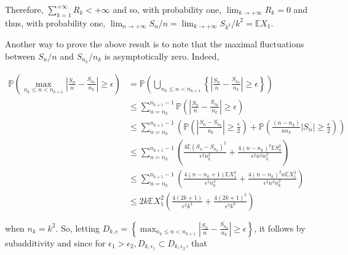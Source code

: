 \documentclass{amsbook}
\theoremstyle{plain}%
\theoremstyle{definition}
\theoremstyle{remark}
\begin{document}
    Therefore, $\sum_{k=1}^{+\infty} R_{k}<+\infty$ and so, with probability one, $\lim _{k \rightarrow+\infty} R_{k}=0$ and thus, with probability one, $\lim _{n \rightarrow+\infty} S_{n} / n=\lim _{k \rightarrow+\infty} S_{k^{2}} / k^{2}=\mathbb{E} X_{1}$.

    Another way to prove the above result is to note that the maximal fluctuations between $S_{n} / n$ and $S_{n_{k}} / n_{k}$ is asymptotically zero. Indeed,

    $$
    \begin{aligned}
      \mathbb{P}\left(\max _{n_{k} \leq n<n_{k+1}}\left|\frac{S_{n}}{n}-\frac{S_{n_{k}}}{n_{k}}\right| \geq \epsilon\right) & =\mathbb{P}\left(\bigcup_{n_{k} \leq n<n_{k+1}}\left\{\left|\frac{S_{n}}{n}-\frac{S_{n_{k}}}{n_{k}}\right| \geq \epsilon\right\}\right)                                                                                                     \\
      & \leq \sum_{n=n_{k}}^{n_{k+1}-1} \mathbb{P}\left(\left|\frac{S_{n}}{n}-\frac{S_{n_{k}}}{n_{k}}\right| \geq \epsilon\right)                                                                                                                   \\
      & \leq \sum_{n=n_{k}}^{n_{k+1}-1}\left(\mathbb{P}\left(\left|\frac{S_{n}-S_{n_{k}}}{n_{k}}\right| \geq \frac{\epsilon}{2}\right)+\mathbb{P}\left(\frac{\left(n-n_{k}\right)}{n n_{k}}\left|S_{n}\right| \geq \frac{\epsilon}{2}\right)\right) \\
      & \leq \sum_{n=n_{k}}^{n_{k+1}-1}\left(\frac{4 \mathbb{E}\left(S_{n}-S_{n_{k}}\right)^{2}}{\epsilon^{2} n_{k}^{2}}+\frac{4\left(n-n_{k}\right)^{2} \mathbb{E} S_{n}^{2}}{\epsilon^{2} n^{2} n_{k}^{2}}\right)                                 \\
      & \leq \sum_{n=n_{k}}^{n_{k+1}-1}\left(\frac{4\left(n-n_{k}+1\right) \mathbb{E} X_{1}^{2}}{\epsilon^{2} n_{k}^{4}}+\frac{4\left(n-n_{k}\right)^{2} n \mathbb{E} X_{1}^{2}}{\epsilon^{2} n^{2} n_{k}^{2}}\right)                               \\
      & \leq 2 k \mathbb{E} X_{1}^{2}\left(\frac{4(2 k+1)}{\epsilon^{2} k^{4}}+\frac{4(2 k+1)^{2}}{\epsilon^{2} k^{6}}\right)
    \end{aligned}
    $$

    when $n_{k}=k^{2}$. So, letting $D_{k, \epsilon}=\left\{\max _{n_{k} \leq n<n_{k+1}}\left|\frac{S_{n}}{n}-\frac{S_{n_{k}}}{n_{k}}\right| \geq \epsilon\right\}$, it follows by subadditivity and since for $\epsilon_{1}>\epsilon_{2}, D_{k, \epsilon_{1}} \subset D_{k, \epsilon_{2}}$, that
\end{document}
